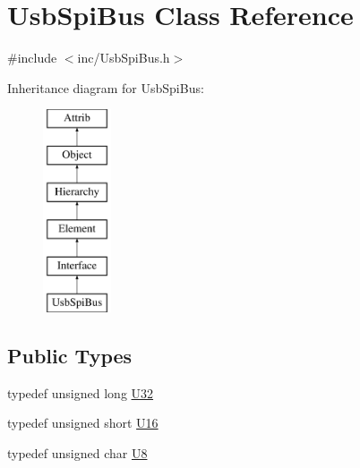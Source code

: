 \hypertarget{classUsbSpiBus}{}\section{Usb\+Spi\+Bus Class Reference}
\label{classUsbSpiBus}


{\ttfamily \#include $<$inc/\+Usb\+Spi\+Bus.\+h$>$}

Inheritance diagram for Usb\+Spi\+Bus\+:\begin{figure}[H]
\begin{center}
\leavevmode
\includegraphics[height=6.000000cm]{classUsbSpiBus}
\end{center}
\end{figure}
\subsection*{Public Types}
\begin{DoxyCompactItemize}
\item 
typedef unsigned long \hyperlink{classUsbSpiBus_a9b24e28662a35ca57f5ed32c41c5f3ff}{U32}
\item 
typedef unsigned short \hyperlink{classUsbSpiBus_a741e3c698b080973693ceb990017a560}{U16}
\item 
typedef unsigned char \hyperlink{classUsbSpiBus_a11336f4ad104fbd4fb454be044f19fc8}{U8}
\end{DoxyCompactItemize}
